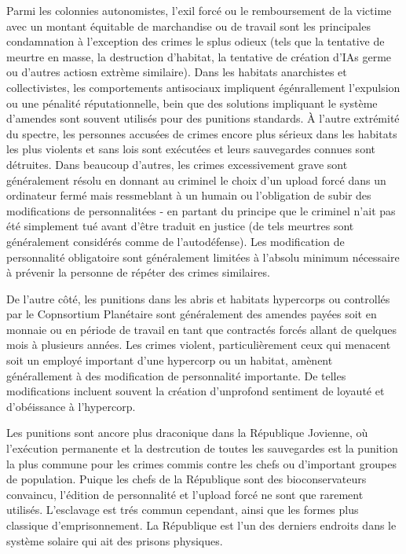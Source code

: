 Parmi les colonnies autonomistes, l'exil forcé ou le remboursement de la victime avec un montant équitable de marchandise ou de travail sont les principales condamnation à l'exception des crimes le splus odieux (tels que la  tentative de meurtre en masse, la destruction d'habitat, la tentative de création d'IAs germe ou d'autres actiosn extrème similaire). Dans les habitats anarchistes et collectivistes, les comportements antisociaux impliquent égénrallement l'expulsion ou une pénalité réputationnelle, bein que des solutions impliquant le système d'amendes sont souvent utilisés pour des punitions standards. À l'autre extrémité du spectre, les personnes accusées de crimes encore plus sérieux dans les habitats les plus violents et sans lois sont exécutées et leurs sauvegardes connues sont détruites. Dans beaucoup d'autres, les crimes excessivement grave sont généralement résolu en donnant au criminel le choix d'un upload forcé dans un ordinateur fermé mais ressmeblant à un humain ou l'obligation de subir des modifications de personnalitées - en partant du principe que le criminel n'ait pas été simplement tué avant d'être traduit en justice (de tels meurtres sont généralement considérés comme de l'autodéfense). Les modification de personnalité obligatoire sont généralement limitées à l'absolu minimum nécessaire à prévenir la personne de répéter des crimes similaires. 

De l'autre côté, les punitions dans les abris et habitats hypercorps ou controllés par le Copnsortium Planétaire sont généralement des amendes payées soit en monnaie ou en période de travail en tant que contractés forcés allant de quelques mois à plusieurs années. Les crimes violent, particulièrement ceux qui menacent soit un employé important d'une hypercorp ou un habitat, amènent générallement à des modification de personnalité importante. De telles modifications incluent souvent la création d'unprofond sentiment de loyauté et d'obéissance à l'hypercorp. 

Les punitions sont ancore plus draconique dans la République Jovienne, où l'exécution permanente et la destrcution de toutes les sauvegardes est la punition la plus commune pour les crimes commis contre les chefs ou d'important groupes de population. Puique les chefs de la République sont des bioconservateurs convaincu, l'édition de personnalité et l'upload forcé ne sont que rarement utilisés. L'esclavage est trés commun cependant, ainsi que les formes plus classique d'emprisonnement. La République est l'un des derniers endroits dans le système solaire qui ait des prisons physiques. 

